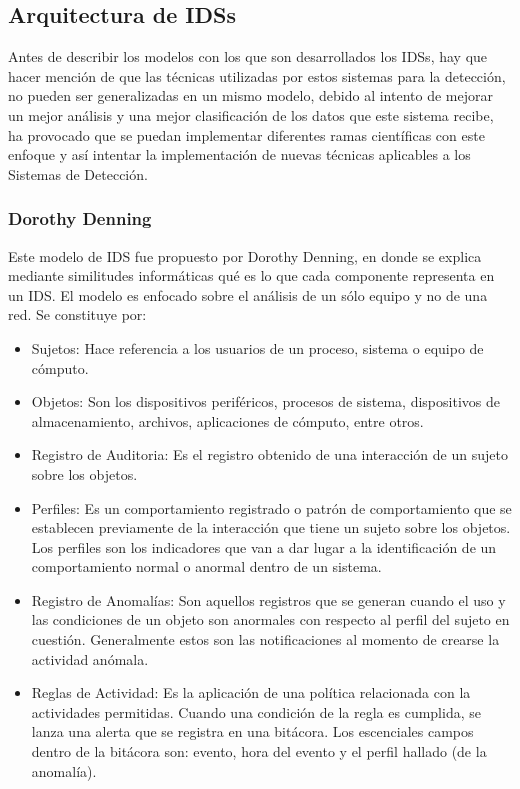 \subsection{Arquitectura de IDSs}

Antes de describir los modelos con los que son desarrollados los IDSs, hay que hacer mención de que las técnicas utilizadas por estos sistemas para la detección, no pueden ser generalizadas en un mismo modelo, debido al intento de mejorar un mejor análisis y una mejor clasificación de los datos que este sistema recibe, ha provocado que se puedan implementar diferentes ramas científicas con este enfoque y así intentar la implementación de nuevas técnicas aplicables a los Sistemas de Detección.\\ 

	\subsubsection{Dorothy Denning}
	
	Este modelo de IDS fue propuesto por Dorothy Denning, en donde se explica mediante similitudes informáticas qué es lo que cada componente representa en un IDS. El modelo es enfocado sobre el análisis de un sólo equipo y no de una red. Se constituye por:\\

	\begin{itemize}
		\item Sujetos: Hace referencia a los usuarios de un proceso, sistema o equipo de cómputo.
		\item Objetos: Son los dispositivos periféricos, procesos de sistema, dispositivos de almacenamiento, archivos, aplicaciones de cómputo, entre otros.
		\item Registro de Auditoria: Es el registro obtenido de una interacción de un sujeto sobre los objetos.
		\item Perfiles: Es un comportamiento registrado o patrón de comportamiento que se establecen previamente de la interacción que tiene un sujeto sobre los objetos. Los perfiles son los indicadores que van a dar lugar a la identificación de un comportamiento normal o anormal dentro de un sistema.
		\item Registro de Anomalías: Son aquellos registros que se generan cuando el uso y las condiciones de un objeto son anormales con respecto al perfil del sujeto en cuestión. Generalmente estos son las notificaciones al momento de crearse la actividad anómala.
		\item Reglas de Actividad: Es la aplicación de una política relacionada con la actividades permitidas. Cuando una condición de la regla es cumplida, se lanza una alerta que se registra en una bitácora. Los escenciales campos dentro de la bitácora son: evento, hora del evento y el perfil hallado (de la anomalía).
	\end{itemize}
	
